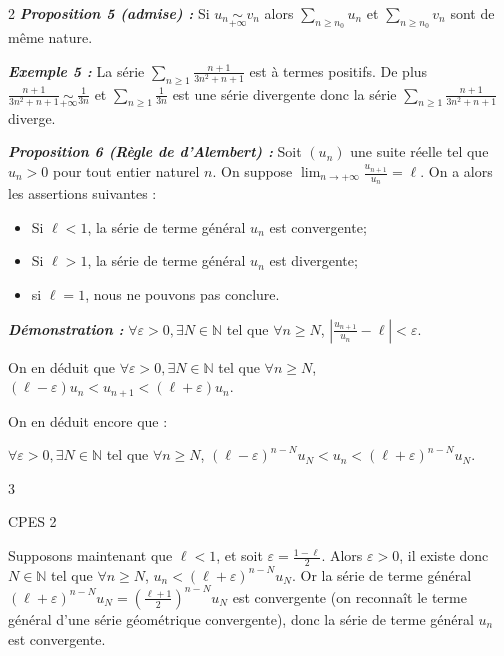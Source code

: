 \documentclass[10pt,a4paper]{article}
\begin{document}
\begin{multicols}{2}
\textbf{\textit{Proposition 5 (admise) :}} Si $u_n \underset{+\infty}{\sim} v_n$ alors $\sum_{n \ge n_0} u_n$ et $\sum_{n \ge n_0} v_n$ sont de même nature.

\textbf{\textit{Exemple 5 :}} La série $\sum_{n \ge 1} \frac{n+1}{3n^2+n+1}$ est à termes positifs. De plus $\frac{n+1}{3n^2+n+1} \underset{+\infty}{\sim} \frac{1}{3n}$ et $\sum_{n \ge 1} \frac{1}{3n}$ est une série divergente donc la série $\sum_{n \ge 1} \frac{n+1}{3n^2+n+1}$ diverge.

\textbf{\textit{Proposition 6 (Règle de d'Alembert) :}} Soit $(u_n)$ une suite réelle tel que $u_n > 0$ pour tout entier naturel $n$. On suppose $\lim_{n \to +\infty} \frac{u_{n+1}}{u_n} = \ell$. On a alors les assertions suivantes :
\begin{itemize}
\item[\tiny$\blacksquare$] Si $\ell < 1$, la série de terme général $u_n$ est convergente;
\item[\tiny$\blacksquare$] Si $\ell > 1$, la série de terme général $u_n$ est divergente;
\item[\tiny$\blacksquare$] si $\ell = 1$, nous ne pouvons pas conclure.
\end{itemize}

\textbf{\textit{Démonstration :}} $\forall \varepsilon > 0, \exists N \in \mathbb{N}$ tel que $\forall n \ge N$, $\left|\frac{u_{n+1}}{u_n} - \ell\right| < \varepsilon$.

On en déduit que $\forall \varepsilon > 0, \exists N \in \mathbb{N}$ tel que $\forall n \ge N$, $(\ell - \varepsilon)u_n < u_{n+1} < (\ell + \varepsilon)u_n$.

On en déduit encore que :

$\forall \varepsilon > 0, \exists N \in \mathbb{N}$ tel que $\forall n \ge N$, $(\ell - \varepsilon)^{n-N}u_N < u_n < (\ell + \varepsilon)^{n-N}u_N$.

\vfill
\centerline{\footnotesize 3}

\newpage

\begin{flushright}
\footnotesize CPES 2
\end{flushright}
\vspace{-0.2cm}

Supposons maintenant que $\ell < 1$, et soit $\varepsilon = \frac{1-\ell}{2}$. Alors $\varepsilon > 0$, il existe donc $N \in \mathbb{N}$ tel que $\forall n \ge N$, $u_n < (\ell + \varepsilon)^{n-N}u_N$. Or la série de terme général $(\ell + \varepsilon)^{n-N}u_N = \left(\frac{\ell+1}{2}\right)^{n-N}u_N$ est convergente (on reconnaît le terme général d'une série géométrique convergente), donc la série de terme général $u_n$ est convergente.


\end{multicols}
\end{document}
